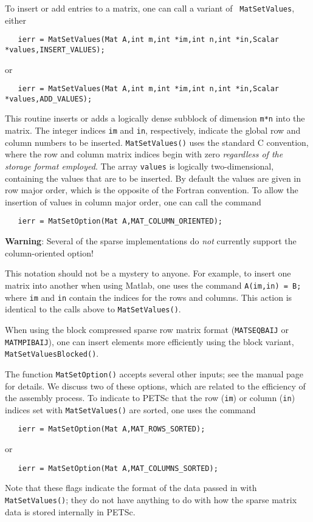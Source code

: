 To insert or add entries to a matrix, one can call a variant of {\tt
MatSetValues}, either 
\begin{verbatim}
   ierr = MatSetValues(Mat A,int m,int *im,int n,int *in,Scalar *values,INSERT_VALUES);
\end{verbatim}
or 
\begin{verbatim}
   ierr = MatSetValues(Mat A,int m,int *im,int n,int *in,Scalar *values,ADD_VALUES);
\end{verbatim}
This routine inserts or adds a logically dense subblock of dimension
{\tt m*n} into the 
matrix. The integer indices {\tt im} and {\tt in}, respectively, indicate the 
global row and column numbers to be inserted.  {\tt MatSetValues()} uses the 
standard C convention, where the row and column matrix indices begin with 
zero {\em regardless of the storage format employed}.   The array 
{\tt values} is logically two-dimensional, containing the values that are 
to be inserted.   
By default the values are given in row major order, which is the opposite 
of the Fortran convention. To allow the insertion of values in column 
major order, one can call the command 
\begin{verbatim}
   ierr = MatSetOption(Mat A,MAT_COLUMN_ORIENTED);
\end{verbatim}
{\bf Warning}: Several of the sparse implementations do {\em not} currently support
the column-oriented option!

This notation should not be a mystery to anyone. For example, 
to insert one matrix into another when using Matlab, one uses the command 
{\tt A(im,in) = B;} where {\tt im} and {\tt in} contain the indices for the
rows and columns. This action is identical to the calls above to 
{\tt MatSetValues()}.

When using the block compressed sparse row matrix format ({\tt MATSEQBAIJ} or
{\tt MATMPIBAIJ}), one can insert elements more efficiently using the block
variant, {\tt MatSetValuesBlocked()}. 

The function {\tt MatSetOption()} accepts several other inputs; see
the manual page for details. We
discuss two of these options, which are related to the efficiency of the
assembly process.  To indicate to PETSc that the row ({\tt im}) or
column ({\tt in}) indices set with {\tt MatSetValues()} are sorted,
one uses the command  
\begin{verbatim}
   ierr = MatSetOption(Mat A,MAT_ROWS_SORTED);
\end{verbatim}
or 
\begin{verbatim}
   ierr = MatSetOption(Mat A,MAT_COLUMNS_SORTED);
\end{verbatim}
Note that these flags indicate the format of the data passed in with 
{\tt MatSetValues()}; they do not have anything to do with how the sparse
matrix data is stored internally in PETSc.

